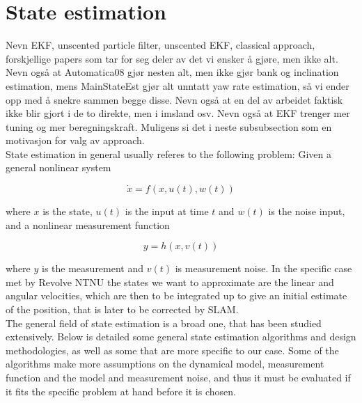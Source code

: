\section{State estimation}
Nevn EKF, unscented particle filter, unscented EKF, classical approach, forskjellige papers som tar for seg deler av det vi ønsker å gjøre, men ikke alt. Nevn også at Automatica08 gjør nesten alt, men ikke gjør bank og inclination estimation, mens MainStateEst gjør alt unntatt yaw rate estimation, så vi ender opp med å snekre sammen begge disse. Nevn også at en del av arbeidet faktisk ikke blir gjort i de to direkte, men i imsland osv. Nevn også at EKF trenger mer tuning og mer beregningskraft. Muligens si det i neste subsubsection som en motivasjon for valg av approach. \\ 

State estimation in general usually referes to the following problem: Given a general nonlinear system 

\begin{equation}
    \Dot{x} = f(x,u(t), w(t))
\end{equation}

where $x$ is the state, $u(t)$ is the input at time $t$ and $w(t)$ is the noise input, and a nonlinear measurement function

\begin{equation}
    y = h(x,v(t))
\end{equation}

where $y$ is the measurement and $v(t)$ is measurement noise. In the specific case met by Revolve NTNU the states we want to approximate are the linear and angular velocities, which are then to be integrated up to give an initial estimate of the position, that is later to be corrected by SLAM. \\

The general field of state estimation is a broad one, that has been studied extensively. Below is detailed some general state estimation algorithms and design methodologies, as well as some that are more specific to our case. Some of the algorithms make more assumptions on the dynamical model, measurement function and the model and measurement noise, and thus it must be evaluated if it fits the specific problem at hand before it is chosen. \\

